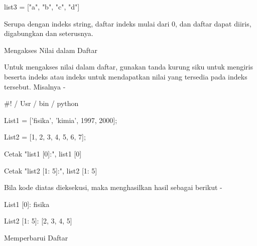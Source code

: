 \documentclass[a4paper,12pt]{report}
\begin{document}
\noindent 
{\fontsize{14pt}{14pt}\selectfont list3 = ["a", "b", "c", "d"] \\} \par
\noindent 
{\fontsize{14pt}{14pt}\selectfont Serupa dengan indeks string, daftar indeks mulai dari 0, dan daftar dapat diiris, digabungkan dan seterusnya. \\} \par
\noindent 
{\fontsize{14pt}{14pt}\selectfont Mengakses Nilai dalam Daftar \\} \par
\noindent 
{\fontsize{14pt}{14pt}\selectfont Untuk mengakses nilai dalam daftar, gunakan tanda kurung siku untuk mengiris beserta indeks atau indeks untuk mendapatkan nilai yang tersedia pada indeks tersebut. Misalnya - \\} \par
\vspace{14pt}
\noindent 
{\fontsize{14pt}{14pt}\selectfont  $  \#  $! / Usr / bin / python \\} \par
\vspace{14pt}
\noindent 
{\fontsize{14pt}{14pt}\selectfont List1 = ['fisika', 'kimia', 1997, 2000]; \\} \par
\noindent 
{\fontsize{14pt}{14pt}\selectfont List2 = [1, 2, 3, 4, 5, 6, 7]; \\} \par
\vspace{14pt}
\noindent 
{\fontsize{14pt}{14pt}\selectfont Cetak "list1 [0]:", list1 [0] \\} \par
\noindent 
{\fontsize{14pt}{14pt}\selectfont Cetak "list2 [1: 5]:", list2 [1: 5] \\} \par
\vspace{14pt}
\noindent 
{\fontsize{14pt}{14pt}\selectfont Bila kode diatas dieksekusi, maka menghasilkan hasil sebagai berikut - \\} \par
\vspace{14pt}
\noindent 
{\fontsize{14pt}{14pt}\selectfont List1 [0]: fisika \\} \par
\noindent 
{\fontsize{14pt}{14pt}\selectfont List2 [1: 5]: [2, 3, 4, 5] \\} \par
\vspace{14pt}
\noindent 
{\fontsize{14pt}{14pt}\selectfont Memperbarui Daftar \\} \par
\end{document}
